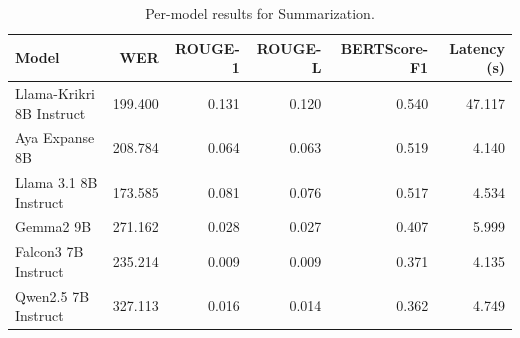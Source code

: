 \begin{table}[t]
\centering
\caption{Per-model results for Summarization.}
\label{tab:appendix-summarization-analysis}
\begin{tabular}{lrrrrr}
\toprule
Model & WER & ROUGE-1 & ROUGE-L & BERTScore-F1 & Latency (s) \\
\midrule
Llama-Krikri 8B Instruct & 199.400 & 0.131 & 0.120 & 0.540 & 47.117 \\
Aya Expanse 8B & 208.784 & 0.064 & 0.063 & 0.519 & 4.140 \\
Llama 3.1 8B Instruct & 173.585 & 0.081 & 0.076 & 0.517 & 4.534 \\
Gemma2 9B & 271.162 & 0.028 & 0.027 & 0.407 & 5.999 \\
Falcon3 7B Instruct & 235.214 & 0.009 & 0.009 & 0.371 & 4.135 \\
Qwen2.5 7B Instruct & 327.113 & 0.016 & 0.014 & 0.362 & 4.749 \\
\bottomrule
\end{tabular}
\end{table}
